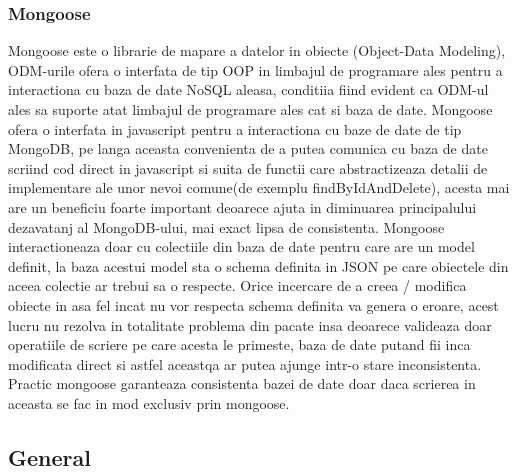 \documentclass[12pt,a4paper,hidelinks]{report}
\theoremstyle{definition}
\theoremstyle{remark}
\begin{document}
\subsubsection{Mongoose}
Mongoose este o librarie de mapare a datelor in obiecte (Object-Data Modeling), ODM-urile 
ofera o interfata de tip OOP in limbajul de programare ales pentru a interactiona cu baza de date NoSQL aleasa,
conditiia fiind evident ca ODM-ul ales sa suporte atat
limbajul de programare ales cat si baza de date. Mongoose ofera o interfata in javascript pentru 
a interactiona cu baze de date de tip MongoDB, pe langa aceasta convenienta de a putea comunica cu baza de date 
scriind cod direct in javascript si suita de functii care abstractizeaza detalii de implementare ale unor
nevoi comune(de exemplu findByIdAndDelete), acesta mai are un beneficiu foarte important  
deoarece ajuta in diminuarea principalului dezavatanj al MongoDB-ului, mai exact lipsa de consistenta.
Mongoose interactioneaza doar cu colectiile din baza de date pentru care are un model definit, la baza acestui 
model sta o schema definita in JSON pe care obiectele din aceea colectie ar trebui sa o respecte. Orice incercare
de a creea / modifica obiecte in asa fel incat nu vor respecta schema definita va genera o eroare, acest lucru 
nu rezolva in totalitate problema din pacate insa deoarece valideaza doar operatiile de scriere pe care acesta le primeste,  
baza de date putand fii inca modificata direct si astfel aceastqa ar putea ajunge intr-o stare inconsistenta. 
Practic mongoose garanteaza consistenta bazei de date doar daca scrierea in aceasta se fac in mod exclusiv
prin mongoose.
\subsection{General}
\end{document}
